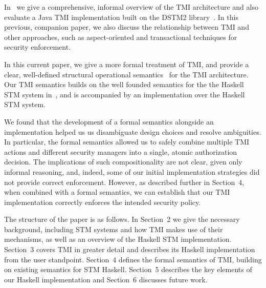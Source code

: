In~\cite{tmi} we give a comprehensive, informal overview of the TMI architecture and also evaluate 
a Java TMI implementation built on the DSTM2 library~\cite{hlm06}.
In this previous, companion paper,
we also discuss the relationship between TMI and other approaches, 
such as aspect-oriented and transactional 
techniques for security enforcement.

In this current paper, we give a more
formal treatment of TMI, and 
provide a clear, well-defined 
structural operational semantics~\cite{Plotkin04a} 
for the TMI architecture.
Our TMI semantics builds on the well founded semantics
for the the Haskell
STM system in~\cite{haskellstm},
and is
accompanied by an implementation over the Haskell STM system.


We found that the development of a formal semantics 
alongside an implementation 
helped us us disambiguate design choices
and resolve ambiguities.
%
In particular, 
the formal semantics allowed us to
safely combine
multiple TMI actions and different security managers
into a single, atomic authorization decision.
%
The implications
of such compositionality are not clear, given only informal reasoning,
and,
indeed, some of our initial implementation strategies
did not provide correct enforcement.
%
However, 
as described further in Section~4,
when combined with a formal semantics,
we can establish that our TMI implementation
correctly enforces the intended security policy.


The structure of the paper is as follows. In Section~2 we give the necessary background, including
STM systems and how TMI makes use of their mechanisms, as well as an overview of the Haskell STM
implementation. Section~3 covers TMI in greater detail and describes its Haskell implementation
from the user standpoint. Section~4 defines the formal semantics of TMI, building on existing
semantics for STM Haskell. Section~5 describes the key elements of our Haskell implementation
and Section~6 discusses future work.

